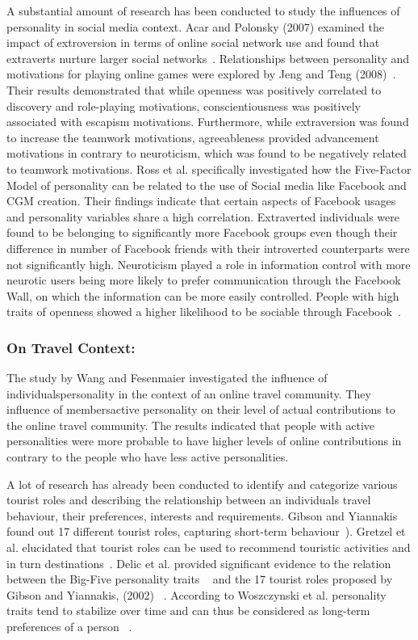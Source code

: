 A substantial amount of research has been conducted to study the influences of personality in social media context. Acar and Polonsky (2007) examined the impact of extroversion in terms of online social network use and found that extraverts nurture larger social networks~\cite{acar2007online}. Relationships between personality and motivations for playing online games were explored by Jeng and Teng (2008)~\cite{jeng2008personality}. Their results demonstrated that while openness was positively correlated to discovery and role-playing motivations, conscientiousness was positively associated with escapism motivations. Furthermore, while extraversion was found to increase the teamwork motivations, agreeableness provided advancement motivations in contrary to neuroticism, which was found to be negatively related to teamwork motivations. Ross et al. specifically investigated how the Five-Factor Model of personality can be related to the use of Social media like Facebook and CGM creation. Their findings indicate that certain aspects of Facebook usages and personality variables share a high correlation. Extraverted individuals were found to be belonging to significantly more Facebook groups even though their difference in number of Facebook friends with their introverted counterparts were not significantly high. Neuroticism played a role in information control with more neurotic users being more likely to prefer communication through the Facebook Wall, on which the information can be more easily controlled. People with high traits of openness showed a higher likelihood to be sociable through Facebook~\cite{ross2009personality}. 


\subsubsection{On Travel Context: }\label{3.3}

The study by Wang and Fesenmaier investigated the influence of individuals\textquotesingle  personality in the context of an online travel community. They influence of members\textquotesingle  active personality on their level of actual contributions to the online travel community. The results indicated that people with active personalities were more probable to have higher levels of online contributions in contrary to the people who have less active personalities.


A lot of research has already been conducted to identify and categorize various tourist roles and describing the relationship between an individual\textquotesingle s travel behaviour, their preferences, interests and requirements. Gibson and Yiannakis found out 17 different tourist roles, capturing short-term behaviour~\cite{gibson2002tourist}). Gretzel et al. elucidated that tourist roles can be used to recommend touristic activities and in turn destinations~\cite{gretzel2006travel}. Delic et al. provided significant evidence to the relation between the Big-Five personality traits ~\cite{goldberg1990alternative} and the 17 tourist roles proposed by Gibson and Yiannakis, (2002) ~\cite{delic2016sun}. According to Woszczynski et al. personality traits tend to stabilize over time and can thus be considered as long-term preferences of a person ~\cite{woszczynski2002exploring}.

